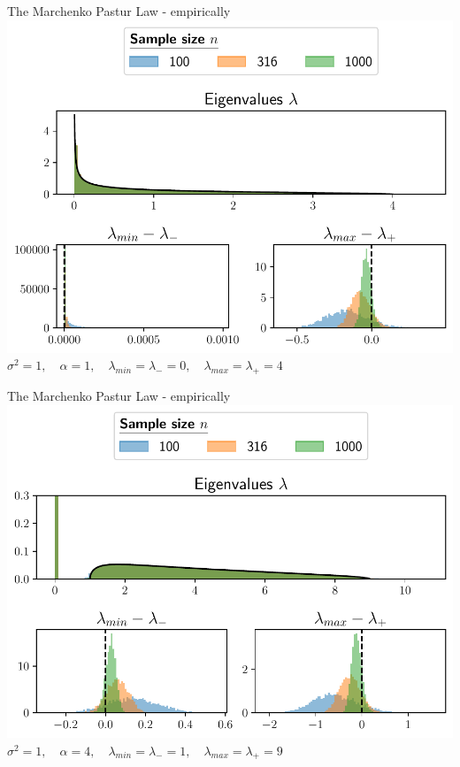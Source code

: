 \documentclass{beamer}
\begin{document}
    \begin{frame}{The Marchenko Pastur Law - empirically}
        \centering
        \includegraphics[width=.8\textwidth]{marchenko_pastur_alpha=1.pdf}\\[.5em]
        $\sigma^2=1, \quad\alpha = 1, \quad \lambda_{min} = \lambda_- = 0, \quad \lambda_{max} = \lambda_+ = 4$\\

    \end{frame}

    \begin{frame}{The Marchenko Pastur Law - empirically}
        \centering
        \includegraphics[width=.8\textwidth]{marchenko_pastur_alpha=4.pdf}\\[.5em]
        $\sigma^2=1, \quad\alpha = 4, \quad \lambda_{min} = \lambda_- = 1, \quad \lambda_{max} = \lambda_+ = 9$\\

    \end{frame}
\end{document}

